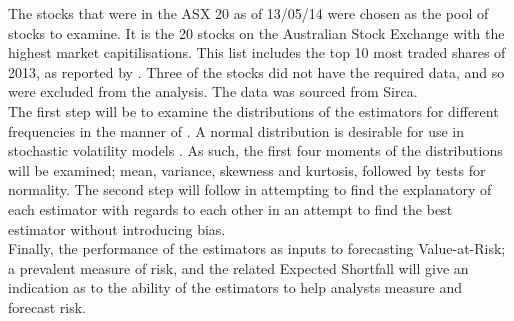 \documentclass[12pt]{article}
\begin{document}
The stocks that were in the ASX 20 as of 13/05/14 were chosen as the pool of stocks to examine. It is the 20
stocks on the Australian Stock Exchange with the highest market capitilisations. This list includes the top
10 most traded shares of 2013, as reported by \citet{MostTradesASX10}. Three of the stocks did not have the
required data, and so were excluded from the analysis. The data was sourced from Sirca. \\

The first step will be to examine the distributions of the estimators for different frequencies in the manner
of \citet{Christensen2007}. A normal distribution is desirable for use in stochastic volatility models
\citep{Christensen2007}. As such, the first four moments of the distributions will be examined; mean,
variance, skewness and kurtosis, followed by tests for normality. The second step will follow
\citet{Martens2007} in attempting to find the explanatory of each estimator with regards to each other in an
attempt to find the best estimator without introducing bias. \\

Finally, the performance of the estimators as inputs to forecasting Value-at-Risk; a prevalent measure of
risk, and the related Expected Shortfall will give an indication as to the ability of the estimators to help
analysts measure and forecast risk. 

\clearpage

\end{document}
